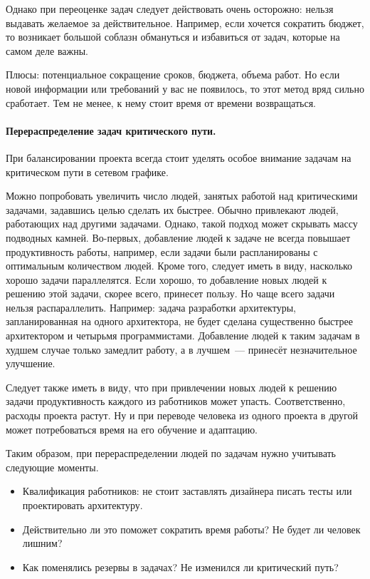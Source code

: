 \documentclass{../../text-style}
\begin{document}
Однако при переоценке задач следует действовать очень осторожно: нельзя выдавать желаемое за действительное. Например, если хочется сократить бюджет, то возникает большой соблазн обмануться и избавиться от задач, которые на самом деле важны.

Плюсы: потенциальное сокращение сроков, бюджета, объема работ. Но если новой информации или требований у вас не появилось, то этот метод вряд сильно сработает. Тем не менее, к нему стоит время от времени возвращаться.

\paragraph{Перераспределение задач критического пути.} При балансировании проекта всегда стоит уделять особое внимание задачам на критическом пути в сетевом графике.

Можно попробовать увеличить число людей, занятых работой над критическими задачами, задавшись целью сделать их быстрее. Обычно привлекают людей, работающих над другими задачами. Однако, такой подход может скрывать массу подводных камней. Во-первых, добавление людей к задаче не всегда повышает продуктивность работы, например, если задачи были распланированы с оптимальным количеством людей. Кроме того, следует иметь в виду, насколько хорошо задачи параллелятся. Если хорошо, то добавление новых людей к решению этой задачи, скорее всего, принесет пользу. Но чаще всего задачи нельзя распараллелить. Например: задача разработки архитектуры, запланированная на одного архитектора, не будет сделана существенно быстрее архитектором и четырьмя программистами. Добавление людей к таким задачам в худшем случае только замедлит работу, а в лучшем~--- принесёт незначительное улучшение.

Следует также иметь в виду, что при привлечении новых людей к решению задачи продуктивность каждого из работников может упасть. Соответственно, расходы проекта растут. Ну и при переводе человека из одного проекта в другой может потребоваться время на его обучение и адаптацию.

Таким образом, при перераспределении людей по задачам нужно учитывать следующие моменты.

\begin{itemize}
    \item Квалификация работников: не стоит заставлять дизайнера писать тесты или проектировать архитектуру.
    \item Действительно ли это поможет сократить время работы? Не будет ли человек лишним? 
    \item Как поменялись резервы в задачах? Не изменился ли критический путь?
\end{itemize}
\end{document}

